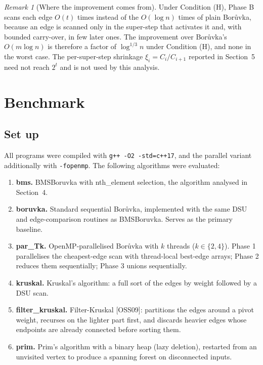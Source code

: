 \documentclass[11pt]{article}
\theoremstyle{plain}
\theoremstyle{remark}
\newtheorem{remark}{Remark}
\begin{document}
\begin{remark}[Where the improvement comes from]
Under Condition (H), Phase B scans each edge \(O(t)\) times instead of
the \(O(\log n)\) times of plain Borůvka, because an edge is scanned
only in the super-step that activates it and, with bounded carry-over,
in few later ones. The improvement over Borůvka's \(O(m\log n)\) is
therefore a factor of \(\log^{1/3} n\) under Condition (H), and none in
the worst case. The per-super-step shrinkage \(\xi_i = C_i/C_{i+1}\)
reported in Section~5 need not reach \(2^{t}\) and is not used by this
analysis.
\end{remark}

\section{Benchmark}

\subsection{Set up}

All programs were compiled with \texttt{g++ -O2 -std=c++17}, and the
parallel variant additionally with \texttt{-fopenmp}. The following
algorithms were evaluated:

\begin{enumerate}
\def\labelenumi{\arabic{enumi}.}
\item
  \textbf{bms.} BMSBoruvka with nth\_element selection, the algorithm
  analysed in Section~4.
\item
  \textbf{boruvka.} Standard sequential Borůvka, implemented with the
  same DSU and edge-comparison routines as BMSBoruvka. Serves as the
  primary baseline.
\item
  \textbf{par\_Tk.} OpenMP-parallelised Borůvka with \(k\) threads
  (\(k \in \{2, 4\}\)). Phase 1 parallelises the cheapest-edge scan with
  thread-local best-edge arrays; Phase 2 reduces them sequentially;
  Phase 3 unions sequentially.
\item
  \textbf{kruskal.} Kruskal's algorithm: a full sort of the edges by
  weight followed by a DSU scan.
\item
  \textbf{filter\_kruskal.} Filter-Kruskal {[}OSS09{]}: partitions the
  edges around a pivot weight, recurses on the lighter part first, and
  discards heavier edges whose endpoints are already connected before
  sorting them.
\item
  \textbf{prim.} Prim's algorithm with a binary heap (lazy deletion),
  restarted from an unvisited vertex to produce a spanning forest on
  disconnected inputs.
\end{enumerate}
\end{document}
